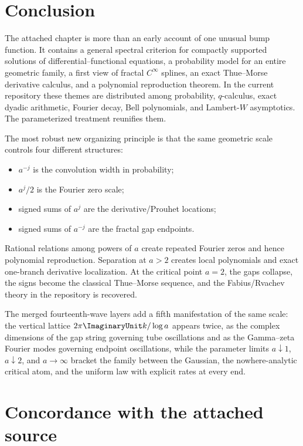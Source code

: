 \documentclass[11pt,oneside]{article}
\numberwithin{equation}{section}
\theoremstyle{definition}
\theoremstyle{remark}
\begin{document}
\section{Conclusion}

The attached chapter is more than an early account of one unusual bump
function.  It contains a general spectral criterion for compactly supported
solutions of differential--functional equations, a probability model for an
entire geometric family, a first view of fractal $C^\infty$ splines, an exact
Thue--Morse derivative calculus, and a polynomial reproduction theorem.  In the
current repository these themes are distributed among probability,
$q$-calculus, exact dyadic arithmetic, Fourier decay, Bell polynomials, and
Lambert-$W$ asymptotics.  The parameterized treatment reunifies them.

The most robust new organizing principle is that the same geometric scale
controls four different structures:
\begin{itemize}
\item $a^{-j}$ is the convolution width in probability;
\item $a^j/2$ is the Fourier zero scale;
\item signed sums of $a^j$ are the derivative/Prouhet locations;
\item signed sums of $a^{-j}$ are the fractal gap endpoints.
\end{itemize}
Rational relations among powers of $a$ create repeated Fourier zeros and hence
polynomial reproduction.  Separation at $a>2$ creates local polynomials and
exact one-branch derivative localization.  At the critical point $a=2$, the
gaps collapse, the signs become the classical Thue--Morse sequence, and the
Fabius/Rvachev theory in the repository is recovered.

The merged fourteenth-wave layers add a fifth manifestation of the same scale:
the vertical lattice $2\pi\ImaginaryUnit k/\log a$ appears twice, as the complex
dimensions of the gap string governing tube oscillations and as the
Gamma--zeta Fourier modes governing endpoint oscillations, while the parameter
limits $a\downarrow1$, $a\downarrow2$, and $a\to\infty$ bracket the family
between the Gaussian, the nowhere-analytic critical atom, and the uniform law
with explicit rates at every end.

\appendix
\section{Concordance with the attached source}
\end{document}
